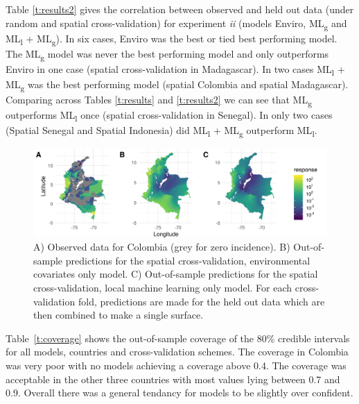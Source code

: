 \documentclass[review]{elsarticle}
\begin{document}
Table \ref{t:results2} gives the correlation between observed and held out data (under random and spatial cross-validation) for experiment \emph{ii} (models Enviro, ML\textsubscript{g} and ML\textsubscript{l} + ML\textsubscript{g}).
In six cases, Enviro was the best or tied best performing model.
The ML\textsubscript{g} model was never the best performing model and only outperforms Enviro in one case (spatial cross-validation in Madagascar).
In two cases ML\textsubscript{l} + ML\textsubscript{g} was the best performing model (spatial Colombia and spatial Madagascar).
Comparing across Tables \ref{t:results} and \ref{t:results2} we can see that ML\textsubscript{g} outperforms ML\textsubscript{l} once (spatial cross-validation in Senegal).
In only two cases (Spatial Senegal and Spatial Indonesia) did ML\textsubscript{l} + ML\textsubscript{g} outperform ML\textsubscript{l}.



\begin{figure}[t!]
\centering
\includegraphics[width = 1\textwidth]{figs/col_comparison_map.png} %
\caption{
  A) Observed data for Colombia (grey for zero incidence). B) Out-of-sample predictions for the spatial cross-validation, environmental covariates only model. C) Out-of-sample predictions for the spatial cross-validation, local machine learning only model. For each cross-validation fold, predictions are made for the held out data which are then combined to make a single surface.
}
\label{f:map}
\end{figure}

Table~\ref{t:coverage} shows the out-of-sample coverage of the 80\% credible intervals for all models, countries and cross-validation schemes.
The coverage in Colombia was very poor with no models achieving a coverage above 0.4.
The coverage was acceptable in the other three countries with most values lying between 0.7 and 0.9.
Overall there was a general tendancy for models to be slightly over confident.
\end{document}
